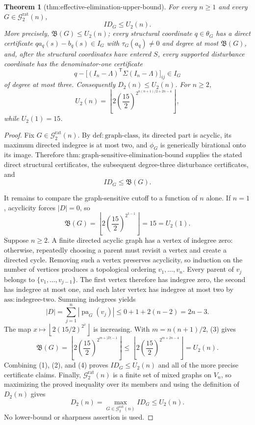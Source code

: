 \documentclass{article}
\newtheorem{theorem}{Theorem}
\begin{document}
\begin{theorem}[thm:effective-elimination-upper-bound]\label{thm:effective-elimination-upper-bound}
For every \(n\geq1\) and every \(G\in\mathcal G_{2}^{\mathrm{rat}}(n)\),
\[
 ID_G\leq U_2(n).
\]
More precisely, \(\mathfrak B(G)\leq U_2(n)\); every structural coordinate \(q\in\theta_G\) has a direct certificate \(q a_q(s)-b_q(s)\in I_G\) with \(\tau_G(a_q)\neq0\) and degree at most \(\mathfrak B(G)\), and, after the structural coordinates have entered \(S\), every supported disturbance coordinate has the denominator-one certificate
\[
 q-\bigl[(I_n-\Lambda)^{\mathsf T}\Sigma(I_n-\Lambda)\bigr]_{ij}\in I_G
\]
of degree at most three.  Consequently \(D_2(n)\leq U_2(n)\).  For \(n\geq2\),
\[
 U_2(n)=
 \left\lfloor
 2\left(\frac{15}{2}\right)^{2^{n(n+1)/2+2n-4}}
 \right\rfloor,
\]
while \(U_2(1)=15\).
\end{theorem}
\begin{proof}
Fix \(G\in\mathcal G_{2}^{\mathrm{rat}}(n)\).  By \(\mathrm{def:graph\mbox{-}class}\), its directed part is acyclic, its maximum directed indegree is at most two, and \(\phi_G\) is generically birational onto its image.  Therefore \(\mathrm{thm:graph\mbox{-}sensitive\mbox{-}elimination\mbox{-}bound}\) supplies the stated direct structural certificates, the subsequent degree-three disturbance certificates, and
\[
 ID_G\leq\mathfrak B(G).
 \tag{1}
\]

It remains to compare the graph-sensitive cutoff to a function of \(n\) alone.  If \(n=1\), acyclicity forces \(|D|=0\), so
\[
 \mathfrak B(G)
 =\left\lfloor2\left(\frac{15}{2}\right)^{2^{1-1}}\right\rfloor
 =15
 =U_2(1).
 \tag{2}
\]
Suppose \(n\geq2\).  A finite directed acyclic graph has a vertex of indegree zero: otherwise, repeatedly choosing a parent must revisit a vertex and create a directed cycle.  Removing such a vertex preserves acyclicity, so induction on the number of vertices produces a topological ordering \(v_1,\ldots,v_n\).  Every parent of \(v_j\) belongs to \(\{v_1,\ldots,v_{j-1}\}\).  The first vertex therefore has indegree zero, the second has indegree at most one, and each later vertex has indegree at most two by \(\mathrm{ass:indegree\mbox{-}two}\).  Summing indegrees yields
\[
 |D|=\sum_{j=1}^n|\operatorname{pa}_G(v_j)|
 \leq0+1+2(n-2)=2n-3.
 \tag{3}
\]
The map \(x\mapsto\left\lfloor2(15/2)^{2^x}\right\rfloor\) is increasing.  With \(m=n(n+1)/2\), (3) gives
\[
 \mathfrak B(G)
 =\left\lfloor2\left(\frac{15}{2}\right)^{2^{m+|D|-1}}\right\rfloor
 \leq
 \left\lfloor2\left(\frac{15}{2}\right)^{2^{m+2n-4}}\right\rfloor
 =U_2(n).
 \tag{4}
\]
Combining (1), (2), and (4) proves \(ID_G\leq U_2(n)\) and all of the more precise certificate claims.  Finally, \(\mathcal G_{2}^{\mathrm{rat}}(n)\) is a finite set of mixed graphs on \(V_n\), so maximizing the proved inequality over its members and using the definition of \(D_2(n)\) gives
\[
 D_2(n)=\max_{G\in\mathcal G_{2}^{\mathrm{rat}}(n)}ID_G\leq U_2(n).
\]
No lower-bound or sharpness assertion is used.
\end{proof}
\end{document}
